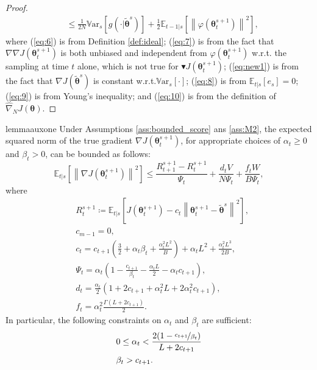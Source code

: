 \documentclass{article}
\makeatletter
\theoremstyle{remark}
\theoremstyle{definition}
\DeclareRobustCommand{\wrt}{w.r.t.\@\xspace}
\newcommand{\norm}[2][\infty]{\left\|#2\right\|_{#1}}
\newcommand{\dnabla}{\nabla\!\!\!\!\nabla}
\newcommand{\vtheta}{\boldsymbol{\theta}}
\newcommand{\gradJ}[1]{\nabla J(#1)}
\newcommand{\gradApp}[2]{\widehat{\nabla}_{#2}J(#1)}
\newcommand{\Ets}[2][t]{\mathbb{E}_{#1\vert s}\left[#2\right]}
\newcommand{\Vars}[1]{{\mathbb{V}\text{ar}}_{s}\left[#1\right]}
\newcommand{\gradBlack}[1]{\blacktriangledown J(#1)}
\newcommand{\gradIdeal}[1]{\dnabla J(#1)}
\makeatother
\begin{document}
\begin{proof}
\begin{align}
	&\leq
	\frac{1}{2N}\Vars{g(\cdot\vert\tilde{\vtheta}^s)} +\frac{1}{2}\Ets[t-1]{\norm[]{\varphi(\vtheta_t^{s+1})}^2},
	\nonumber
\end{align}
where (\ref{eq:6}) is from Definition \ref{def:ideal}; (\ref{eq:7}) is from the fact that $\gradIdeal{\vtheta_t^{s+1}}$ is both unbiased and independent from $\varphi(\vtheta_t^{s+1})$ \wrt the sampling at time $t$ alone, which is not true for $\gradBlack{\vtheta_t^{s+1}}$; 
(\ref{eq:new1}) is from the fact that $\gradJ{\tilde{\vtheta}^s}$ is constant \wrt $\Vars{\cdot}$;
(\ref{eq:8}) is from $\Ets{e_s}=0$; (\ref{eq:9}) is from Young's inequality; and (\ref{eq:10}) is from the definition of $\gradApp{\vtheta}{N}$.
\end{proof}

\begin{restatable}[]{lemma}{auxone}\label{lemma:aux1}
Under Assumptions \ref{ass:bounded_score} ans \ref{ass:M2}, the expected squared norm of the true gradient $\gradJ{\vtheta_t^{s+1}}$, for appropriate choices of $\alpha_t\geq0$ and $\beta_t>0$, can be bounded as follows:
\[
	\Ets{\norm[]{\gradJ{\vtheta_t^{s+1}}}^2} \leq
	\frac{R_{t+1}^{s+1} - R_t^{s+1}}{\Psi_t} + \frac{d_tV}{N\Psi_t}
	+\frac{f_tW}{B\Psi_t},
\]
	where
\begin{align*}
	&R_t^{s+1}\coloneqq \Ets{J(\vtheta_t^{s+1}) - c_t\norm[]{\vtheta_t^{s+1}-\tilde{\vtheta}^s}^2}, \\
	&c_{m-1} = 0, \\
	&c_t = c_{t+1}\left(\frac{3}{2}+\alpha_t\beta_t+\frac{\alpha_t^2L^2}{B}\right) + \alpha_tL^2+\frac{\alpha_t^2L^3}{2B}, \\
	&\Psi_t = \alpha_t\left(1-\frac{c_{t+1}}{\beta_t}-\frac{\alpha_tL}{2}-\alpha_tc_{t+1}\right), \\
	&d_t = \frac{\alpha_t}{2}\left(1+2c_{t+1}+\alpha_t^2L+2\alpha_t^2c_{t+1}\right), \\
	&f_t = \alpha_t^2\frac{\Gamma(L+2c_{t+1})}{2}.
\end{align*}
In particular, the following constraints on $\alpha_t$ and $\beta_t$ are sufficient:
\begin{align*}
&0\leq\alpha_t < \frac{2(1-\nicefrac{c_{t+1}}{\beta_t})}{L+2c_{t+1}} \\
&\beta_t > c_{t+1}.
\end{align*}
\end{restatable}
\end{document}
